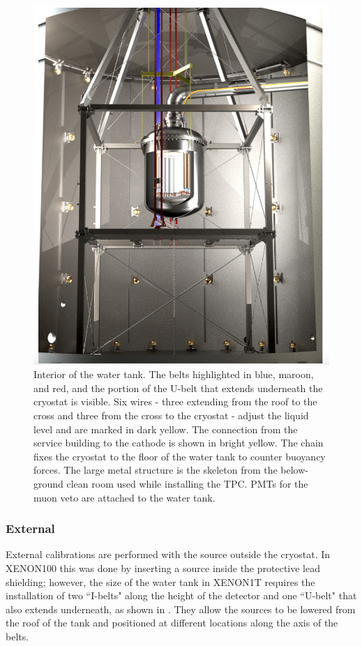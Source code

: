 \begin{figure}
\centering
\includegraphics[width=\textwidth]{WaterTankInside}
\caption{Interior of the water tank.  The belts highlighted in blue, maroon, and red, and the portion of the U-belt that extends
underneath the cryostat is visible.  Six wires - three extending from the roof to the cross and three from the cross to the
cryostat - adjust the liquid level and are marked in dark yellow.  The connection from the service building to the cathode is shown in
bright yellow.  The chain fixes the cryostat to the floor of the water tank to counter buoyancy forces.  The large metal structure is the
skeleton from the below-ground clean room used while installing the TPC.  PMTs for the muon veto are attached to the water tank.}
\label{fig:water_tank_inside}
\end{figure}



\subsubsection{External}
\label{subsubsec:xenon1t_calibrations_external}
External calibrations are performed with the source outside the cryostat.  In XENON100 this was done by inserting a source inside the
protective lead
shielding; however, the size of the water tank in XENON1T requires the installation of two ``I-belts"
along the height of the detector and one ``U-belt" that also extends underneath, as shown in
.  They
allow the sources to be lowered from the roof of the tank and positioned at different locations along the axis of the
belts.

